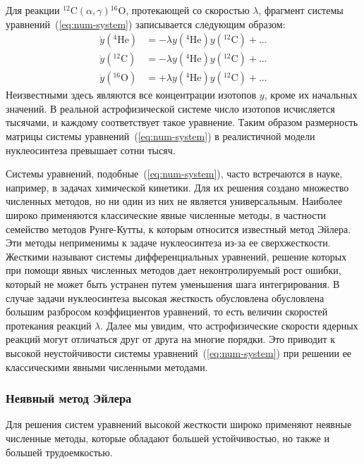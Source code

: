 Для реакции \({^{12}}\text{C} (\alpha,\gamma) {^{16}}\text{O}\), протекающей со скоростью $\lambda$, фрагмент системы уравнений~(\ref{eq:num-system}) записывается следующим образом:
\begin{equation}
\begin{aligned}
  \dot{y}({^4}\text{He}) &= - \lambda y({^4}\text{He})y({^{12}}\text{C}) + ...\\
  \dot{y}({^{12}}\text{C}) &= - \lambda y({^4}\text{He})y({^{12}}\text{C}) + ...\\
  \dot{y}({^{16}}\text{O}) &= + \lambda y({^4}\text{He})y({^{12}}\text{C}) + ...
\end{aligned}
\end{equation}
Неизвестными здесь являются все концентрации изотопов $y$, кроме их начальных значений. В реальной астрофизической системе число изотопов исчисляется тысячами, и каждому соответствует такое уравнение. Таким образом размерность матрицы системы уравнений~(\ref{eq:num-system}) в реалистичной модели нуклеосинтеза превышает сотни тысяч.

Системы уравнений, подобные~(\ref{eq:num-system}), часто встречаются в науке, например, в задачах химической кинетики. Для их решения создано множество численных методов, но ни один из них не является универсальным. Наиболее широко применяются классические явные численные методы, в частности семейство методов Рунге-Кутты, к которым относится известный метод Эйлера. Эти методы неприменимы к задаче нуклеосинтеза из-за ее сверхжесткости. Жесткими называют системы дифференциальных уравнений, решение которых при помощи явных численных методов дает неконтролируемый рост ошибки, который не может быть устранен путем уменьшения шага интегрирования. В случае задачи нуклеосинтеза высокая жесткость обусловлена обусловлена большим разбросом коэффициентов уравнений, то есть величин скоростей протекания реакций $\lambda$. Далее мы увидим, что астрофизические скорости ядерных реакций могут отличаться друг от друга на многие порядки. Это приводит к высокой неустойчивости системы уравнений~(\ref{eq:num-system}) при решении ее классическими явными численными методами.

\subsubsection{Неявный метод Эйлера}
Для решения систем уравнений высокой жесткости широко применяют неявные численные методы, которые обладают большей устойчивостью, но также и большей трудоемкостью.

